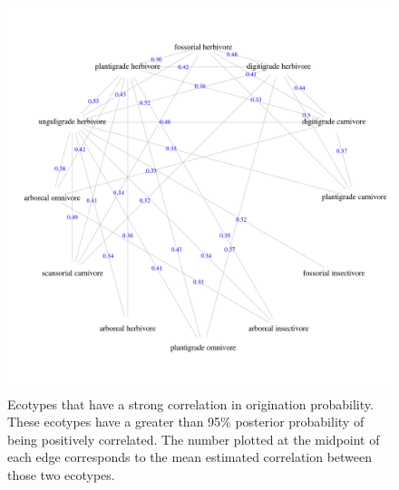 \afterpage{\clearpage}
\begin{figure}[p]
  \centering
  \includegraphics[width=\textwidth,height=\textheight,keepaspectratio=true]{chapter_coping/figure/origin_sig_corr}
  \caption[Ecotypes with strong correlations in origination probability]{Ecotypes that have a strong correlation in origination probability. These ecotypes have a greater than 95\% posterior probability of being positively correlated. The number plotted at the midpoint of each edge corresponds to the mean estimated correlation between those two ecotypes.}
  \label{fig:origin_corr_graph}
\end{figure}

